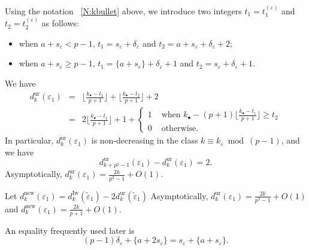 \begin{notation}
    \label{N:t_epsilon}
    Using the notation ~\ref{N:kbullet} above, we introduce two integers $t_1=t_1^{(\varepsilon)}$ and $t_2  =t_2^{(\varepsilon)}$ as follows:
    \begin{itemize}
    \item when $a+s_\varepsilon<p-1$, $t_1 = s_\varepsilon+\delta_\varepsilon$ and $t_2 = a+s_\varepsilon + \delta_\varepsilon+2$;
    \item when $a+s_\varepsilon \geq p-1$, $t_1 =  \{a+s_\varepsilon\} + \delta_\varepsilon+1$ and $t_2 = s_\varepsilon +\delta_\varepsilon+ 1$.
    \end{itemize}
\end{notation}

\begin{definition}
    \label{D:dimension_of_Sunr}
    We have
    \begin{eqnarray}
    \label{E:dkunr}
    d_{k}^{\mathrm{ur}}(\varepsilon_1) &=&
    \Big\lfloor \frac{k_\bullet - t_1}{p+1}\Big\rfloor + \Big\lfloor \frac{k_\bullet - t_2}{p+1}\Big\rfloor + 2
    \\ \nonumber &=& 2\Big\lfloor \frac{k_\bullet - t_1}{p+1}\Big\rfloor + 1 +\begin{cases}
    1 & \textrm{ when }k_\bullet - (p+1) \lfloor \frac{k_\bullet-t_1}{p+1}\rfloor  \geq t_2
    \\
    0 & \textrm{ otherwise.}
    \end{cases}
    \end{eqnarray}
    In particular,  $d_{k}^{\mathrm{ur}}(\varepsilon_1)$ is non-decreasing in the class $k \equiv k_\varepsilon \bmod{(p-1)}$, and we have
    $$d_{k+p^2-1}^{\mathrm{ur}}(\varepsilon_1) - d_{k}^{\mathrm{ur}}(\varepsilon_1) = 2.$$
    Asymptotically, $d_{k}^{\mathrm{ur}}(\varepsilon_1) = \frac{2k}{p^2-1}+O(1)$.
\end{definition}

\begin{notation}
    Let $d_{k}^{\textrm{new}}(\varepsilon_1) = d_{k}^{\mathrm{Iw}}(\tilde \varepsilon_1)- 2 d_{k}^{\mathrm{ur}}(\tilde \varepsilon_1)$
        Asymptotically, $d_{k}^{\mathrm{ur}}(\varepsilon_1) = \frac{2k}{p^2-1}+O(1)$ and  $d_k^{\mathrm{new}}(\varepsilon_1) = \frac{2k}{p+1}+O(1)$.
\end{notation}

\begin{remark}
    \label{R:delta}
    An equality frequently used later is
    \[
    (p-1)\delta_{\varepsilon}+\{a+2s_{\varepsilon}\}=s_{\varepsilon}+\{a+s_{\varepsilon}\}.
    \]
\end{remark}

